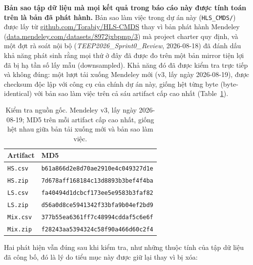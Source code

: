 \documentclass[11pt]{article}
\begin{document}
\textbf{Bản sao tập dữ liệu mà mọi kết quả trong báo cáo này được tính
toán trên là bản đã phát hành.} Bản sao làm việc trong dự án này
(\texttt{HLS\_CMDS/}) được lấy từ
\href{https://github.com/Torabiy/HLS-CMDS}{github.com/Torabiy/HLS-CMDS}
thay vì bản phát hành Mendeley
(\href{https://data.mendeley.com/datasets/8972jxbpmp/3}{data.mendeley.com/datasets/8972jxbpmp/3})
mà project charter quy định, và một đợt rà soát nội bộ
(\emph{TEEP2026\_Sprint0\_Review}, 2026-08-18) đã đánh dấu khả năng phát
sinh rằng mọi thứ ở đây đã được đo trên một bản mirror tiện lợi đã bị hạ
tần số lấy mẫu (downsampled). Khả năng đó đã được kiểm tra trực tiếp và
không đúng: một lượt tải xuống Mendeley mới (v3, lấy ngày 2026-08-19),
được checksum độc lập với công cụ của chính dự án này, giống hệt từng
byte (byte-identical) với bản sao làm việc trên cả sáu artifact cấp cao
nhất (Table~\ref{tab:checksums}).

\begin{table}[H]
\centering
\caption{Kiểm tra nguồn gốc. Mendeley v3, lấy ngày 2026-08-19; MD5 trên
mỗi artifact cấp cao nhất, giống hệt nhau giữa bản tải xuống mới và bản
sao làm việc.}
\label{tab:checksums}
\begin{tabular}{@{}ll@{}}
\toprule
Artifact & MD5 \\
\midrule
\texttt{HS.csv} & \texttt{b61a866d2e8d70ae2910e4c049327d1e} \\
\texttt{HS.zip} & \texttt{7d678aff168184c13d8893b3bef4f4ba} \\
\texttt{LS.csv} & \texttt{fa40494d1dcbcf173ee5e9583b3faf82} \\
\texttt{LS.zip} & \texttt{d56a0d8ce5941342f33bfa9b04ef2bd9} \\
\texttt{Mix.csv} & \texttt{377b55ea6361ff7c48994cddaf5c6e6f} \\
\texttt{Mix.zip} & \texttt{f28243aa5394324c58f90a466d60c2f4} \\
\bottomrule
\end{tabular}
\end{table}

Hai phát hiện vẫn đúng sau khi kiểm tra, như những thuộc tính của tập dữ
liệu đã công bố, đó là lý do tiểu mục này được giữ lại thay vì bị xóa:
\end{document}
